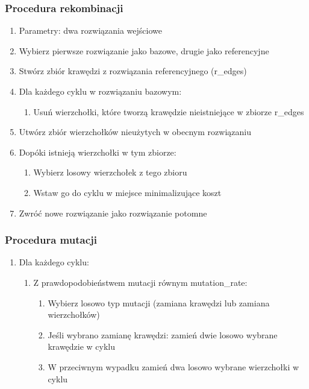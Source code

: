 \documentclass[11pt]{article}
\begin{document}
\subsubsection{Procedura rekombinacji}
\begin{enumerate}
    \item Parametry: dwa rozwiązania wejściowe
    \item Wybierz pierwsze rozwiązanie jako bazowe, drugie jako referencyjne
    \item Stwórz zbiór krawędzi z rozwiązania referencyjnego (r\_edges)
    \item Dla każdego cyklu w rozwiązaniu bazowym:
    \begin{enumerate}
        \item Usuń wierzchołki, które tworzą krawędzie nieistniejące w zbiorze r\_edges
    \end{enumerate}
    \item Utwórz zbiór wierzchołków nieużytych w obecnym rozwiązaniu
    \item Dopóki istnieją wierzchołki w tym zbiorze:
    \begin{enumerate}
        \item Wybierz losowy wierzchołek z tego zbioru
        \item Wstaw go do cyklu w miejsce minimalizujące koszt
    \end{enumerate}
    \item Zwróć nowe rozwiązanie jako rozwiązanie potomne
\end{enumerate}


\subsubsection{Procedura mutacji}

\begin{enumerate}
    \item Dla każdego cyklu:
    \begin{enumerate}
        \item Z prawdopodobieństwem mutacji równym mutation\_rate:
        \begin{enumerate}
            \item Wybierz losowo typ mutacji (zamiana krawędzi lub zamiana wierzchołków)
            \item Jeśli wybrano zamianę krawędzi: zamień dwie losowo wybrane krawędzie w cyklu
            \item W przeciwnym wypadku zamień dwa losowo wybrane wierzchołki w cyklu
        \end{enumerate}
    \end{enumerate}
\end{enumerate}
\end{document}
